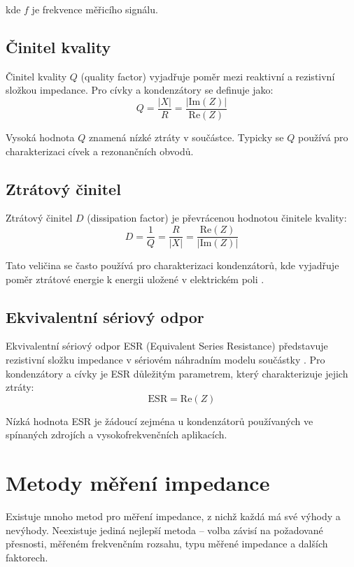 kde $f$ je frekvence měřicího signálu.

\subsection{Činitel kvality}

Činitel kvality $Q$ (quality factor) vyjadřuje poměr mezi reaktivní a rezistivní složkou impedance. \cite{KeysightImpedanceHandbook} Pro cívky a kondenzátory se definuje jako:
\begin{equation}
Q = \frac{|X|}{R} = \frac{|\text{Im}(Z)|}{\text{Re}(Z)}
\end{equation}

Vysoká hodnota $Q$ znamená nízké ztráty v součástce. Typicky se $Q$ používá pro charakterizaci cívek a rezonančních obvodů.

\subsection{Ztrátový činitel}

Ztrátový činitel $D$ (dissipation factor) je převrácenou hodnotou činitele kvality:
\begin{equation}
D = \frac{1}{Q} = \frac{R}{|X|} = \frac{\text{Re}(Z)}{|\text{Im}(Z)|}
\end{equation}

Tato veličina se často používá pro charakterizaci kondenzátorů, kde vyjadřuje poměr ztrátové energie k energii uložené v elektrickém poli \cite{KeysightImpedanceHandbook}.

\subsection{Ekvivalentní sériový odpor}

Ekvivalentní sériový odpor \acs{ESR} (Equivalent Series Resistance) představuje rezistivní složku impedance v sériovém náhradním modelu součástky \cite{KeysightImpedanceHandbook}. Pro kondenzátory a cívky je \acs{ESR} důležitým parametrem, který charakterizuje jejich ztráty:
\begin{equation}
\text{ESR} = \text{Re}(Z)
\end{equation}

Nízká hodnota \acs{ESR} je žádoucí zejména u kondenzátorů používaných ve spínaných zdrojích a vysokofrekvenčních aplikacích.


\section{Metody měření impedance}
Existuje mnoho metod pro měření impedance, z nichž každá má své výhody a nevýhody. \cite{Steinbauer_Mereni2010} 
Neexistuje jediná nejlepší metoda -- volba závisí na požadované přesnosti, 
měřeném frekvenčním rozsahu, typu měřené impedance a dalších faktorech.


